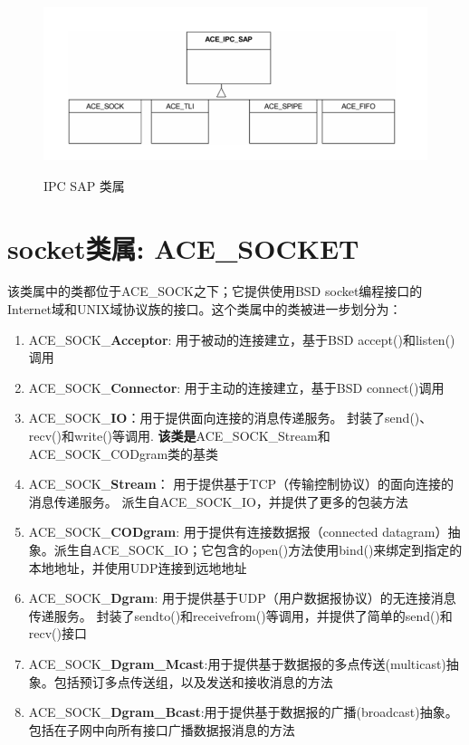 \documentclass[UTF8,a4paper,12pt]{ctexbook}
\begin{document}
		\begin{figure}[h]
			\centering
			\includegraphics[width = 12cm]{IPC_SAP.png}
			\label{fig:IPC_SAP}
			\caption{IPC SAP 类属}
		\end{figure}  
		
	\section{socket类属: ACE\_SOCKET}
		该类属中的类都位于ACE\_SOCK之下；它提供使用BSD socket编程接口的Internet域和UNIX域协议族的接口。这个类属中的类被进一步划分为：
			\begin{enumerate}
				\item ACE\_SOCK\_\textbf{Acceptor}: 用于被动的连接建立，基于BSD accept()和listen()调用
				
				\item ACE\_SOCK\_\textbf{Connector}: 用于主动的连接建立，基于BSD connect()调用
				
				\item ACE\_SOCK\_\textbf{IO}：用于提供面向连接的消息传递服务。 封装了send()、recv()和write()等调用. \textbf{该类是}ACE\_SOCK\_Stream和ACE\_SOCK\_CODgram类的基类
				
				\item ACE\_SOCK\_\textbf{Stream}： 用于提供基于TCP（传输控制协议）的面向连接的消息传递服务。 派生自ACE\_SOCK\_IO，并提供了更多的包装方法
				
				\item ACE\_SOCK\_\textbf{CODgram}: 用于提供有连接数据报（connected datagram）抽象。派生自ACE\_SOCK\_IO；它包含的open()方法使用bind()来绑定到指定的本地地址，并使用UDP连接到远地地址
				
				\item ACE\_SOCK\_\textbf{Dgram}: 用于提供基于UDP（用户数据报协议）的无连接消息传递服务。 封装了sendto()和receivefrom()等调用，并提供了简单的send()和recv()接口
				
				\item ACE\_SOCK\_\textbf{Dgram\_Mcast}:用于提供基于数据报的多点传送(multicast)抽象。包括预订多点传送组，以及发送和接收消息的方法
				
				\item ACE\_SOCK\_\textbf{Dgram\_Bcast}:用于提供基于数据报的广播(broadcast)抽象。包括在子网中向所有接口广播数据报消息的方法
			\end{enumerate}
\end{document}
